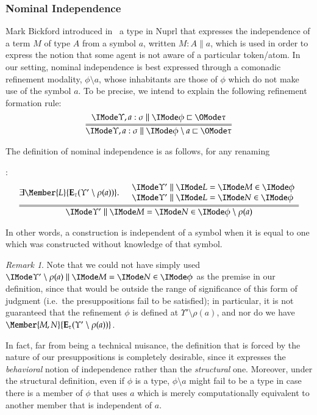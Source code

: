 \documentclass[11pt]{article}
\theoremstyle{definition}
\theoremstyle{notation}
\theoremstyle{remark}
\newtheorem{remark}[thm]{Remark}
\numberwithin{equation}{section}
\newcommand\Exprs{\mathbf{E}}
\begin{document}
\subsubsection{Nominal Independence}

\newcommand\Indep[2]{#1\setminus #2}

Mark Bickford introduced in~\cite{bickford:2008} a type in Nuprl that expresses
the independence of a term $M$ of type $A$ from a symbol $a$, written
$M:A\parallel a$, which is used in order to express the notion that some agent
is not aware of a particular token/atom. In our setting, nominal independence
is best expressed through a comonadic refinement modality, $\Indep{\phi}{a}$, whose
inhabitants are those of $\phi$ which do not make use of the symbol
$a$. To be precise, we intend to explain the following refinement formation
rule:
\[
  \infer={
    \Refines{\Upsilon,a:\sigma}{\Indep{\phi}{a}}{\tau}
  }{
    \Refines{\Upsilon,a:\sigma}{\phi}{\tau}
  }
\]

The definition of nominal independence is as follows, for any renaming
%
:
\[
  \infer={
    \RMemEq{\Upsilon'}{M}{N}{\Indep{\phi}{\rho(a)}}
  }{
    \exists\Member{L}{\Exprs_\tau(\Upsilon'\setminus \rho(a))}.
    \begin{array}{l}
      \quad \RMemEq{\Upsilon'}{L}{M}{\phi}\\
      \quad \RMemEq{\Upsilon'}{L}{N}{\phi}
    \end{array}
  }
\]

In other words, a construction is independent of a symbol when it is equal to
one which was constructed without knowledge of that symbol.

\begin{remark}
  Note that we could not have simply used
  $\RMemEq{\Upsilon'\setminus\rho(a)}{M}{N}{\phi}$ as the premise in our
  definition, since that would be outside the range of significance of this
  form of judgment (i.e.\ the presuppositions fail to be satisfied); in
  particular, it is not guaranteed that the refinement $\phi$ is defined at
  $\Upsilon'\setminus\rho(a)$, and nor do we have
  $\Member{M,N}{\Exprs_\tau(\Upsilon'\setminus\rho(a))}$.

  In fact, far from being a technical nuisance, the definition that is forced
  by the nature of our presuppositions is completely desirable, since it
  expresses the \emph{behavioral} notion of independence rather than the
  \emph{structural} one. Moreover, under the structural definition, even if
  $\phi$ is a type, $\phi\setminus a$ might fail to be a type in case there is
  a member of $\phi$ that uses $a$ which is merely computationally equivalent
  to another member that is independent of $a$.
\end{remark}
\end{document}
